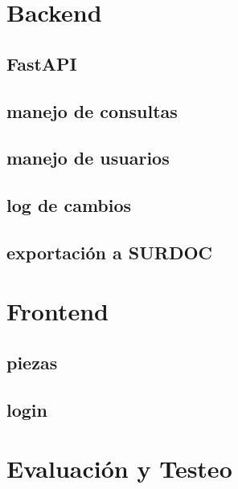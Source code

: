 \section{Backend}

\subsection{FastAPI}
\subsection{manejo de consultas}
\subsection{manejo de usuarios}
\subsection{log de cambios}
\subsection{exportación a SURDOC}

\section{Frontend}
\subsection{piezas}
\subsection{login}

\section{Evaluación y Testeo}